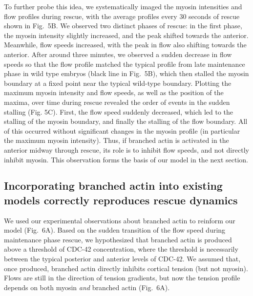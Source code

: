 \documentclass[11pt]{article}
\newcommand{\6}[1]{#1_{\text{6}}}
\newcommand{\3}[1]{#1_{\text{3}}}
\begin{document}
To further probe this idea, we systematically imaged the myosin intensities and flow profiles during rescue, with the average profiles every 30 seconds of rescue shown in Fig.\ 5B. We observed two distinct phases of rescue: in the first phase, the myosin intensity slightly increased, and the peak shifted towards the anterior. Meanwhile, flow speeds increased, with the peak in flow also shifting towards the anterior. After around three minutes, we observed a sudden decrease in flow speeds so that the flow profile matched the typical profile from late maintenance phase in wild type embryos (black line in Fig.\ 5B), which then stalled the myosin boundary at a fixed point near the typical wild-type boundary. Plotting the maximum myosin intensity and flow speeds, as well as the position of the maxima, over time during rescue revealed the order of events in the sudden stalling (Fig. 5C). First, the flow speed suddenly decreased, which led to the stalling of the myosin boundary, and finally the stalling of the flow boundary. All of this occurred without significant changes in the myosin profile (in particular the maximum myosin intensity). Thus, if branched actin is activated in the anterior midway through rescue, its role is to inhibit flow speeds, and not directly inhibit myosin. This observation forms the basis of our model in the next section.

\subsection*{Incorporating branched actin into existing models correctly reproduces rescue dynamics}
We used our experimental observations about branched actin to reinform our model (Fig.\ 6A). Based on the sudden transition of the flow speed during maintenance phase rescue, we hypothesized that branched actin is produced above a threshold of CDC-42 concentration, where the threshold is necessarily between the typical posterior and anterior levels of CDC-42. We assumed that, once produced, branched actin directly inhibits cortical tension (but not myosin). Flows are still in the direction of tension gradients, but now the tension profile depends on both myosin \emph{and} branched actin (Fig.\ 6A).
\end{document}
